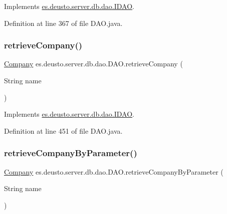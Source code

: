 Implements \hyperlink{interfacees_1_1deusto_1_1server_1_1db_1_1dao_1_1_i_d_a_o_aef2783889a572e23bd57c5a2a955599a}{es.\+deusto.\+server.\+db.\+dao.\+I\+D\+AO}.



Definition at line 367 of file D\+A\+O.\+java.

\mbox{\label{classes_1_1deusto_1_1server_1_1db_1_1dao_1_1_d_a_o_aabd374b169473cfd6e1bdc4efc89b177}} 
\subsubsection{\texorpdfstring{retrieve\+Company()}{retrieveCompany()}}
{\footnotesize\ttfamily \hyperlink{classes_1_1deusto_1_1server_1_1db_1_1data_1_1_company}{Company} es.\+deusto.\+server.\+db.\+dao.\+D\+A\+O.\+retrieve\+Company (\begin{DoxyParamCaption}\item[{String}]{name }\end{DoxyParamCaption})}



Implements \hyperlink{interfacees_1_1deusto_1_1server_1_1db_1_1dao_1_1_i_d_a_o_ad6fd7873e2191e887184e2261e34e3e5}{es.\+deusto.\+server.\+db.\+dao.\+I\+D\+AO}.



Definition at line 451 of file D\+A\+O.\+java.

\mbox{\label{classes_1_1deusto_1_1server_1_1db_1_1dao_1_1_d_a_o_af3dc3f84b3ea6981bd5e93d54ab45169}} 
\subsubsection{\texorpdfstring{retrieve\+Company\+By\+Parameter()}{retrieveCompanyByParameter()}}
{\footnotesize\ttfamily \hyperlink{classes_1_1deusto_1_1server_1_1db_1_1data_1_1_company}{Company} es.\+deusto.\+server.\+db.\+dao.\+D\+A\+O.\+retrieve\+Company\+By\+Parameter (\begin{DoxyParamCaption}\item[{String}]{name }\end{DoxyParamCaption})}



